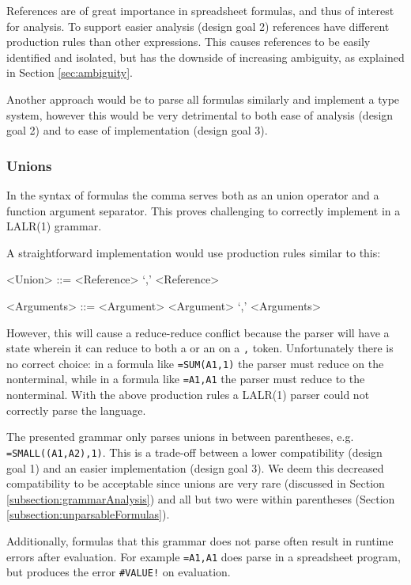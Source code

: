 \documentclass[conference]{IEEEtran}
\begin{document}
References are of great importance in spreadsheet formulas, and thus of interest for analysis.
To support easier analysis (design goal 2) references have different production rules than other expressions.
This causes references to be easily identified and isolated, but has the downside of increasing ambiguity, as explained in Section \ref{sec:ambiguity}. 

Another approach would be to parse all formulas similarly and implement a type system, however this would be very detrimental to both ease of analysis (design goal 2) and to ease of implementation (design goal 3).

\subsubsection{\textbf{Unions}}
\label{subsec:desing:unions}

In the syntax of formulas the comma serves both as an union operator and a function argument separator.
This proves challenging to correctly implement in a LALR(1) grammar.

A straightforward implementation would use production rules similar to this:
\begin{grammar}
<Union> ::= <Reference> `,' <Reference>

<Arguments> ::= <Argument>
	\alt <Argument> `,' <Arguments>
\end{grammar}

However, this will cause a reduce-reduce conflict because the parser will have a state wherein it can reduce to both a  or an  on a \texttt{,} token.
Unfortunately there is no correct choice: in a formula like \texttt{=SUM(A1,1)} the parser must reduce on the  nonterminal, while in a formula like \texttt{=A1,A1} the parser must reduce to the  nonterminal.
With the above production rules a LALR(1) parser could not correctly parse the language.

The presented grammar only parses unions in between parentheses, e.g. \texttt{=SMALL((A1,A2),1)}.
This is a trade-off between a lower compatibility (design goal 1) and an easier implementation (design goal 3).
We deem this decreased compatibility to be acceptable since unions are very rare (discussed in Section \ref{subsection:grammarAnalysis}) and all but two were within parentheses (Section \ref{subsection:unparsableFormulas}).

Additionally, formulas that this grammar does not parse often result in runtime errors after evaluation.
For example \texttt{=A1,A1} does parse in a spreadsheet program, but produces the error \texttt{\#VALUE!} on evaluation.
\end{document}
